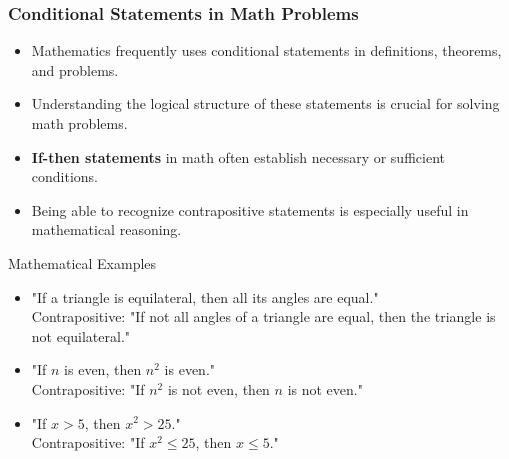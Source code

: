 \documentclass{beamer}
\begin{document}
                                \begin{frame}
                                    \frametitle{Conditional Statements in Math Problems}
                                    \begin{itemize}
                                        \item Mathematics frequently uses conditional statements in definitions, theorems, and problems.
                                        \item Understanding the logical structure of these statements is crucial for solving math problems.
                                        \item \textbf{If-then statements} in math often establish necessary or sufficient conditions.
                                        \item Being able to recognize contrapositive statements is especially useful in mathematical reasoning.
                                    \end{itemize}
                                    
                                    \begin{block}{Mathematical Examples}
                                        \scriptsize
                                    \begin{itemize}
                                        \item "If a triangle is equilateral, then all its angles are equal."\\
                                        Contrapositive: "If not all angles of a triangle are equal, then the triangle is not equilateral."
                                        \item "If $n$ is even, then $n^2$ is even."\\
                                        Contrapositive: "If $n^2$ is not even, then $n$ is not even."
                                        \item "If $x > 5$, then $x^2 > 25$."\\
                                        Contrapositive: "If $x^2 \leq 25$, then $x \leq 5$."
                                    \end{itemize}
                                    \end{block}
                                    \end{frame}
                                    
\end{document}

